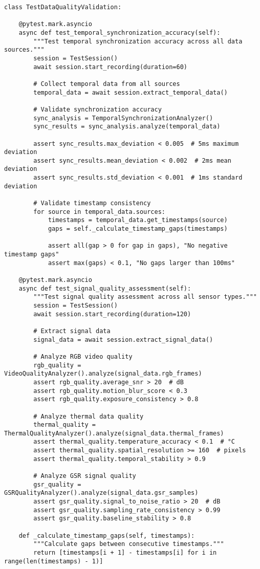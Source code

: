 \documentclass[12pt,a4paper]{report}
\begin{document}
\begin{verbatim}
class TestDataQualityValidation:

    @pytest.mark.asyncio
    async def test_temporal_synchronization_accuracy(self):
        """Test temporal synchronization accuracy across all data sources."""
        session = TestSession()
        await session.start_recording(duration=60)

        # Collect temporal data from all sources
        temporal_data = await session.extract_temporal_data()

        # Validate synchronization accuracy
        sync_analysis = TemporalSynchronizationAnalyzer()
        sync_results = sync_analysis.analyze(temporal_data)

        assert sync_results.max_deviation < 0.005  # 5ms maximum deviation
        assert sync_results.mean_deviation < 0.002  # 2ms mean deviation
        assert sync_results.std_deviation < 0.001  # 1ms standard deviation

        # Validate timestamp consistency
        for source in temporal_data.sources:
            timestamps = temporal_data.get_timestamps(source)
            gaps = self._calculate_timestamp_gaps(timestamps)

            assert all(gap > 0 for gap in gaps), "No negative timestamp gaps"
            assert max(gaps) < 0.1, "No gaps larger than 100ms"

    @pytest.mark.asyncio
    async def test_signal_quality_assessment(self):
        """Test signal quality assessment across all sensor types."""
        session = TestSession()
        await session.start_recording(duration=120)

        # Extract signal data
        signal_data = await session.extract_signal_data()

        # Analyze RGB video quality
        rgb_quality = VideoQualityAnalyzer().analyze(signal_data.rgb_frames)
        assert rgb_quality.average_snr > 20  # dB
        assert rgb_quality.motion_blur_score < 0.3
        assert rgb_quality.exposure_consistency > 0.8

        # Analyze thermal data quality
        thermal_quality = ThermalQualityAnalyzer().analyze(signal_data.thermal_frames)
        assert thermal_quality.temperature_accuracy < 0.1  # °C
        assert thermal_quality.spatial_resolution >= 160  # pixels
        assert thermal_quality.temporal_stability > 0.9

        # Analyze GSR signal quality
        gsr_quality = GSRQualityAnalyzer().analyze(signal_data.gsr_samples)
        assert gsr_quality.signal_to_noise_ratio > 20  # dB
        assert gsr_quality.sampling_rate_consistency > 0.99
        assert gsr_quality.baseline_stability > 0.8

    def _calculate_timestamp_gaps(self, timestamps):
        """Calculate gaps between consecutive timestamps."""
        return [timestamps[i + 1] - timestamps[i] for i in range(len(timestamps) - 1)]
\end{verbatim}
\end{document}
